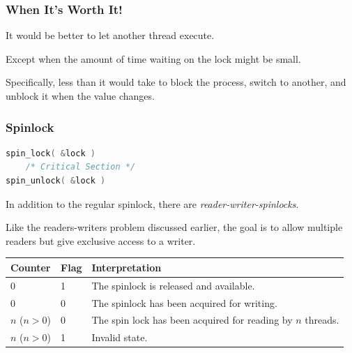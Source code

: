 \begin{frame}
	\frametitle{When It's Worth It!}

	It would be better to let another thread execute.

	Except when the amount of time waiting on the lock might be small.

	Specifically, less than it would take to block the process, switch to another, and unblock it when the value changes.


\end{frame}

\begin{frame}[fragile]
	\frametitle{Spinlock}

	\begin{lstlisting}[language=C]
spin_lock( &lock )
    /* Critical Section */
spin_unlock( &lock )
\end{lstlisting}


	In addition to the regular spinlock, there are \textit{reader-writer-spinlocks}.

	Like the readers-writers problem discussed earlier, the goal is to allow multiple readers but give exclusive access to a writer.

	\begin{center}
		\begin{tabular}{l|l|l}
			\textbf{Counter} & \textbf{Flag} & \textbf{Interpretation}                                     \\\hline
			0                & 1             & The spinlock is released and available.                     \\
			0                & 0             & The spinlock has been acquired for writing.                 \\
			$n$ ($n > 0$)    & 0             & The spin lock has been acquired for reading by $n$ threads. \\
			$n$ ($n > 0$)    & 1             & Invalid state.                                              \\
		\end{tabular}
	\end{center}


\end{frame}





